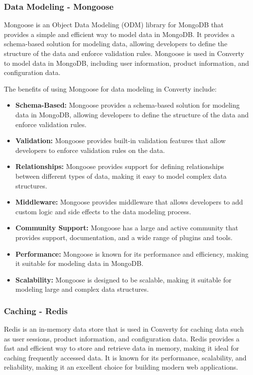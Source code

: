 \subsubsection{Data Modeling - Mongoose}
Mongoose is an Object Data Modeling (ODM) library for MongoDB that provides a simple and efficient way to model data in MongoDB. It provides a schema-based solution for modeling data, allowing developers to define the structure of the data and enforce validation rules. Mongoose is used in Converty to model data in MongoDB, including user information, product information, and configuration data.

The benefits of using Mongoose for data modeling in Converty include:

\begin{itemize}
    \item \textbf{Schema-Based:} Mongoose provides a schema-based solution for modeling data in MongoDB, allowing developers to define the structure of the data and enforce validation rules.
    \item \textbf{Validation:} Mongoose provides built-in validation features that allow developers to enforce validation rules on the data.
    \item \textbf{Relationships:} Mongoose provides support for defining relationships between different types of data, making it easy to model complex data structures.
    \item \textbf{Middleware:} Mongoose provides middleware that allows developers to add custom logic and side effects to the data modeling process.
    \item \textbf{Community Support:} Mongoose has a large and active community that provides support, documentation, and a wide range of plugins and tools.
    \item \textbf{Performance:} Mongoose is known for its performance and efficiency, making it suitable for modeling data in MongoDB.
    \item \textbf{Scalability:} Mongoose is designed to be scalable, making it suitable for modeling large and complex data structures.
\end{itemize}

\subsubsection{Caching - Redis}
Redis is an in-memory data store that is used in Converty for caching data such as user sessions, product information, and configuration data. Redis provides a fast and efficient way to store and retrieve data in memory, making it ideal for caching frequently accessed data. It is known for its performance, scalability, and reliability, making it an excellent choice for building modern web applications.

